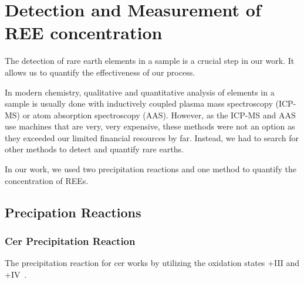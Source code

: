 \section{Detection and Measurement of REE concentration\authorA{}}


The detection of rare earth elements in a sample is a crucial step in our work.
It allows us to quantify the effectiveness of our process.

In modern chemistry,
qualitative and quantitative analysis of elements in a sample is usually done with inductively coupled plasma mass spectroscopy (ICP-MS) or atom absorption spectroscopy (AAS).
However, as the ICP-MS and AAS use machines that are very, very expensive,
these methods were not an option as they exceeded our limited financial resources by far.
Instead, we had to search for other methods to detect and quantify rare earths.

In our work, we used two precipitation reactions and one method to quantify the concentration of REEs.


\subsection{Precipation Reactions}

\subsubsection{Cer Precipitation Reaction}
The precipitation reaction for cer works by utilizing the oxidation states +III and +IV~\cite{cerdetection,janderblasius}.

